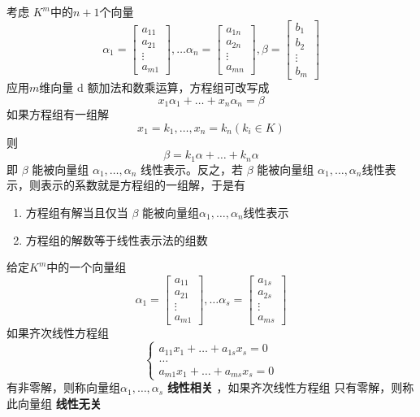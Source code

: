 \documentclass[11pt]{article}
\begin{document}
考虑 \(K^m\)中的\(n+1\)个向量
\begin{equation*}
\alpha_1=
\begin{bmatrix}
a_{11}\\a_{21}\\\vdots\\a_{m1}
\end{bmatrix},\dots
\alpha_n=
\begin{bmatrix}
a_{1n}\\a_{2n}\\\vdots\\a_{mn}
\end{bmatrix},
\beta=
\begin{bmatrix}
b_{1}\\b_{2}\\\vdots\\b_{m}
\end{bmatrix}
\end{equation*}
应用\(m\)维向量 d 额加法和数乘运算，方程组可改写成
\begin{equation*}
x_1\alpha_1+\dots+x_n\alpha_n=\beta
\end{equation*}
如果方程组有一组解
\begin{equation*}
x_1=k_1,\dots,x_n=k_n(k_i\in K)
\end{equation*}
则
\begin{equation*}
\beta=k_1\alpha+\dots+k_n\alpha
\end{equation*}
即 \(\beta\) 能被向量组 \(\alpha_1,\dots,\alpha_n\) 线性表示。反之，若 \(\beta\) 能被向量组
\(\alpha_1,\dots,\alpha_n\)线性表示，则表示的系数就是方程组的一组解，于是有
\begin{enumerate}
\item 方程组有解当且仅当 \(\beta\) 能被向量组\(\alpha_1,\dots,\alpha_n\)线性表示
\item 方程组的解数等于线性表示法的组数
\end{enumerate}
\begin{definition}
给定\(K^m\)中的一个向量组
\begin{equation*}
\alpha_1=
\begin{bmatrix}
a_{11}\\a_{21}\\\vdots\\a_{m1}
\end{bmatrix}   ,\dots
\alpha_s=
\begin{bmatrix}
a_{1s}\\a_{2s}\\\vdots\\a_{ms}
\end{bmatrix}
\end{equation*}
如果齐次线性方程组
\begin{equation*}
\begin{cases}
a_{11}x_1+\dots+a_{1s}x_s=0\\
\dots\\
a_{m1}x_1+\dots+a_{ms}x_s=0
\end{cases}
\end{equation*}
有非零解，则称向量组\(\alpha_1,\dots,\alpha_s\) \textbf{线性相关} ，如果齐次线性方程组
只有零解，则称此向量组 \textbf{线性无关}
\end{definition}
\end{document}
